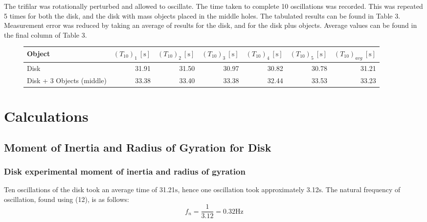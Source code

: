 \documentclass[a4paper]{article}
\begin{document}
\vspace{0.5cm}

The trifilar was rotationally perturbed and allowed to oscillate. The time taken to complete 10 oscillations was recorded. This was repeated 5 times for both the disk, and the disk with mass objects placed in the middle holes. The tabulated results can be found in Table 3. Measurement error was reduced by taking an average of results for the disk, and for the disk plus objects. Average values can be found in the final column of Table 3. 

\vspace{0.5cm}

\begin{figure}[h]
	\centering
	\small
	\begin{tabular}{lrrrrrr}
		\toprule
		Object & $(T_{10})_1 \ [\si{\second}]$ & $(T_{10})_2 \ [\si{\second}]$ & $(T_{10})_3 \ [\si{\second}]$ & $(T_{10})_4 \ [\si{\second}]$ & $(T_{10})_5 \ [\si{\second}]$ & $(T_{10})_{avg} \ [\si{\second}]$ \\
		\midrule
		Disk & 31.91 & 31.50 & 30.97 & 30.82 & 30.78 & 31.21\\
		Disk + 3 Objects (middle) & 33.38 & 33.40 & 33.38 & 32.44 & 33.53 & 33.23 \\
		\bottomrule
	\end{tabular}
\end{figure}


\newpage

\section{Calculations}
\subsection{Moment of Inertia and Radius of Gyration for Disk}
\subsubsection{Disk experimental moment of inertia and radius of gyration}
Ten oscillations of the disk took an average time of 31.21$\si{\second}$, hence one oscillation took approximately 3.12$\si{\second}$. The natural frequency of oscillation, found using (12), is as follows:
\begin{equation}
f_n = \frac{1}{3.12} = 0.32\si{\hertz}
\end{equation}
\end{document}
